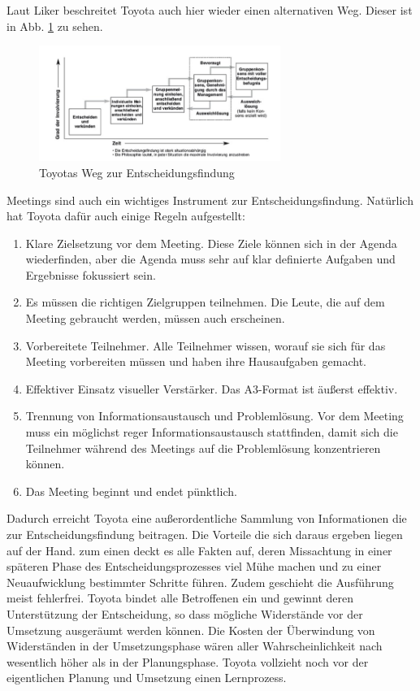 \documentclass[a4paper,12pt]{scrartcl}
\begin{document}
Laut Liker beschreitet Toyota auch hier wieder einen alternativen Weg. Dieser ist in Abb. \ref{Entscheidung} zu sehen.


\begin{figure}[h] 
  \centering
     \includegraphics[width=0.7\textwidth]{Entscheidung.png}
  \caption{Toyotas Weg zur Entscheidungsfindung}
  \label{Entscheidung}
\end{figure}

Meetings sind auch ein wichtiges Instrument zur Entscheidungsfindung. Natürlich hat Toyota dafür auch einige Regeln aufgestellt:

\begin{enumerate}
    \item Klare Zielsetzung vor dem Meeting. Diese Ziele können sich in der Agenda wiederfinden, aber die Agenda muss sehr auf klar definierte Aufgaben und Ergebnisse fokussiert sein.
    \item Es müssen die richtigen Zielgruppen teilnehmen. Die Leute, die auf dem Meeting gebraucht werden, müssen auch erscheinen.
    \item Vorbereitete Teilnehmer. Alle Teilnehmer wissen, worauf sie sich für das Meeting vorbereiten müssen und haben ihre Hausaufgaben gemacht.
    \item Effektiver Einsatz visueller Verstärker. Das A3-Format ist äußerst effektiv.
    \item Trennung von Informationsaustausch und Problemlösung. Vor dem Meeting muss ein möglichst reger Informationsaustausch stattfinden, damit sich die Teilnehmer während des Meetings auf die Problemlösung konzentrieren können.
    \item Das Meeting beginnt und endet pünktlich.
\end{enumerate}

Dadurch erreicht Toyota eine außerordentliche Sammlung von Informationen die zur Entscheidungsfindung beitragen. Die Vorteile die sich daraus ergeben liegen auf der Hand. zum einen deckt es alle Fakten auf, deren Missachtung in einer späteren Phase des Entscheidungsprozesses viel Mühe machen und zu einer Neuaufwicklung bestimmter Schritte führen. Zudem geschieht die Ausführung meist fehlerfrei. Toyota bindet alle Betroffenen ein und gewinnt deren Unterstützung der Entscheidung, so dass mögliche Widerstände vor der Umsetzung ausgeräumt werden können. Die Kosten der Überwindung von Widerständen in der Umsetzungsphase wären aller Wahrscheinlichkeit nach wesentlich höher als in der Planungsphase. Toyota vollzieht noch vor der eigentlichen Planung und Umsetzung einen Lernprozess.
\end{document}

